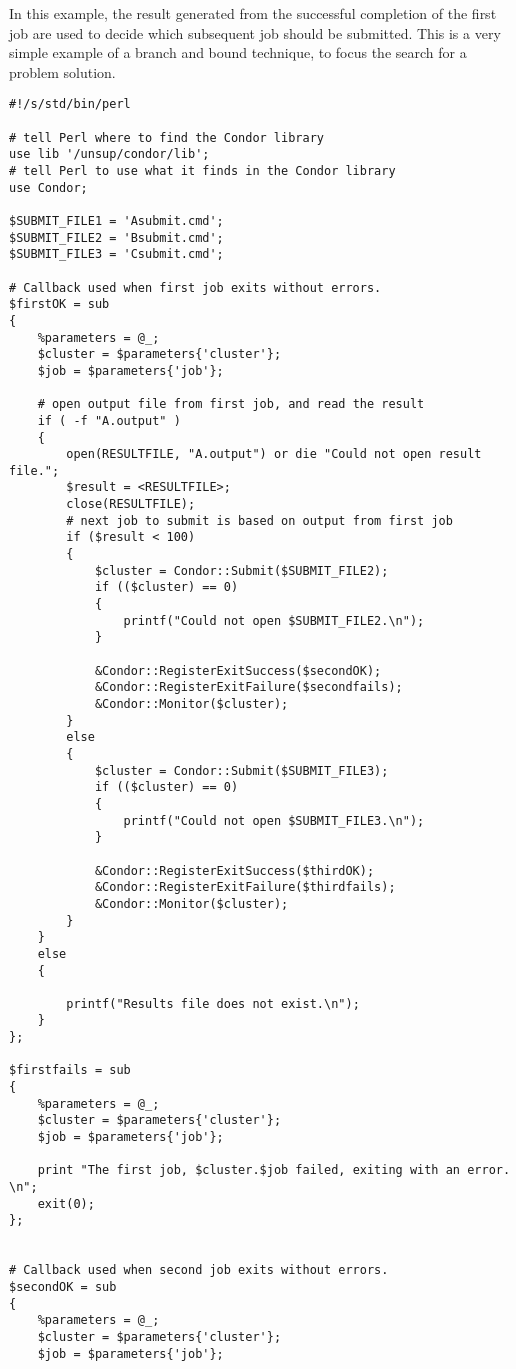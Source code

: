 In this example, the result generated from the successful completion of
the first job are used to decide which subsequent job should be
submitted.
This is a very simple example of a branch and bound technique,
to focus the search for a problem solution.

\footnotesize
\begin{verbatim}
#!/s/std/bin/perl

# tell Perl where to find the Condor library
use lib '/unsup/condor/lib';
# tell Perl to use what it finds in the Condor library
use Condor;

$SUBMIT_FILE1 = 'Asubmit.cmd';
$SUBMIT_FILE2 = 'Bsubmit.cmd';
$SUBMIT_FILE3 = 'Csubmit.cmd';

# Callback used when first job exits without errors.
$firstOK = sub
{
    %parameters = @_;
    $cluster = $parameters{'cluster'};
    $job = $parameters{'job'};

    # open output file from first job, and read the result
    if ( -f "A.output" )
    {
        open(RESULTFILE, "A.output") or die "Could not open result file.";
        $result = <RESULTFILE>;
        close(RESULTFILE);
        # next job to submit is based on output from first job
        if ($result < 100)
        {
            $cluster = Condor::Submit($SUBMIT_FILE2);
            if (($cluster) == 0)
            {
                printf("Could not open $SUBMIT_FILE2.\n");
            }

            &Condor::RegisterExitSuccess($secondOK);
            &Condor::RegisterExitFailure($secondfails);
            &Condor::Monitor($cluster);
        }
        else
        {
            $cluster = Condor::Submit($SUBMIT_FILE3);
            if (($cluster) == 0)
            {
                printf("Could not open $SUBMIT_FILE3.\n");
            }

            &Condor::RegisterExitSuccess($thirdOK);
            &Condor::RegisterExitFailure($thirdfails);
            &Condor::Monitor($cluster);
        }
    }
    else
    {
        
        printf("Results file does not exist.\n");
    }
};	

$firstfails = sub
{
    %parameters = @_;
    $cluster = $parameters{'cluster'};
    $job = $parameters{'job'};

    print "The first job, $cluster.$job failed, exiting with an error. \n";
    exit(0);
};	


# Callback used when second job exits without errors.
$secondOK = sub
{
    %parameters = @_;
    $cluster = $parameters{'cluster'};
    $job = $parameters{'job'};


\end{verbatim}
